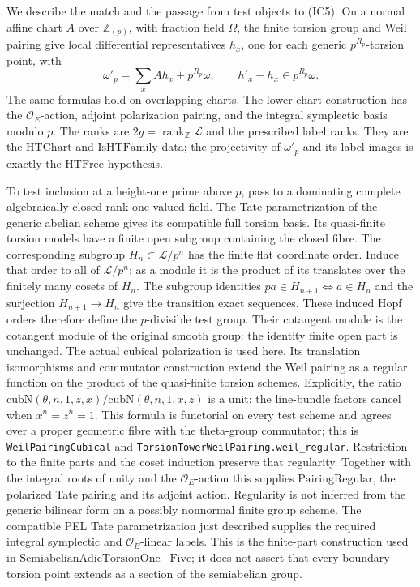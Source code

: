 We describe the match and the passage from test objects
to (IC5). On a normal affine chart \(A\) over
\(\mathbb Z_{(p)}\), with fraction field \(\Omega\),
the finite torsion group and Weil pairing give local
differential representatives \(h_x\), one for each
generic \(p^{R_p}\)-torsion point, with
\[
 \omega'_p=\sum_x A h_x+p^{R_p}\omega,\qquad
                 h'_x-h_x\in p^{R_p}\omega .
 \tag{IC6}
\]
The same formulas hold on overlapping charts.
The lower chart construction has the
\(\mathcal O_E\)-action, adjoint polarization pairing,
and the integral symplectic basis modulo \(p\).
The ranks are \(2g=\operatorname{rank}_{\mathbb Z}\mathcal L\)
and the prescribed label ranks.
They are the \(\mathrm{HTChart}\) and
\(\mathrm{IsHTFamily}\) data; the projectivity of
\(\omega'_p\) and its label images is exactly the
\(\mathrm{HTFree}\) hypothesis.

To test inclusion at a height-one prime above \(p\),
pass to a dominating complete algebraically closed
rank-one valued field.
The Tate parametrization of the generic abelian
scheme gives its compatible full torsion basis.
Its quasi-finite torsion models have a finite open
subgroup containing the closed fibre.
The corresponding subgroup \(H_n\subset\mathcal L/p^n\)
has the finite flat coordinate order.
Induce that order to all of \(\mathcal L/p^n\);
as a module it is the product of its translates over
the finitely many cosets of \(H_n\).
The subgroup identities
\(pa\in H_{n+1}\Longleftrightarrow a\in H_n\)
and the surjection \(H_{n+1}\to H_n\) give the
transition exact sequences.
These induced Hopf orders therefore define the
\(p\)-divisible test group.
Their cotangent module is the cotangent module of
the original smooth group: the identity finite open
part is unchanged.
The actual cubical polarization is used here.
Its translation isomorphisms and commutator construction
extend the Weil pairing as a regular function on
the product of the quasi-finite torsion schemes.
Explicitly, the ratio
\(\mathrm{cubN}(\theta,n,1,z,x)/
\mathrm{cubN}(\theta,n,1,x,z)\)
is a unit: the line-bundle factors cancel when
\(x^n=z^n=1\). This formula is functorial on every
test scheme and agrees over a proper geometric
fibre with the theta-group commutator;
this is \texttt{WeilPairingCubical} and
\texttt{TorsionTowerWeilPairing.weil\_regular}.
Restriction to the finite parts and the coset
induction preserve that regularity.
Together with the integral roots of unity and
the \(\mathcal O_E\)-action this supplies
\(\mathrm{PairingRegular}\), the polarized Tate
pairing and its adjoint action.
Regularity is not inferred from the generic
bilinear form on a possibly nonnormal finite group
scheme. The compatible PEL Tate parametrization
just described supplies the required integral
symplectic and \(\mathcal O_E\)-linear labels.
This is the finite-part construction used in
\(\mathrm{SemiabelianAdicTorsionOne}\)--%
\(\mathrm{Five}\); it does not assert that every
boundary torsion point extends as a section of the
semiabelian group.

